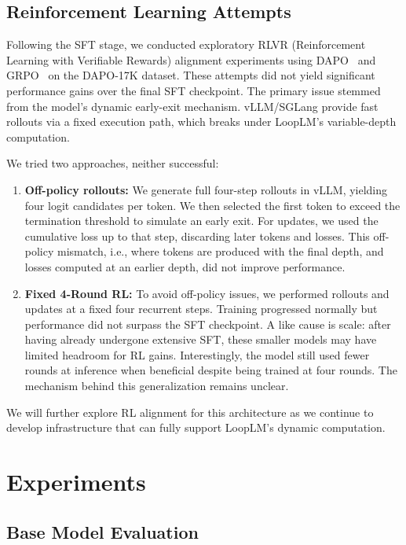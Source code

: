 \documentclass[]{bytedance_seed}
\newcommand{\1}{\mathbf{1}}
\newcommand{\ut}{LoopLM}
\begin{document}
\subsection{Reinforcement Learning Attempts}

Following the SFT stage, we conducted exploratory RLVR (Reinforcement Learning with Verifiable Rewards) alignment experiments using DAPO~\cite{yu2025dapo} and GRPO~\cite{shao2024deepseekmath} on the DAPO-17K dataset. These attempts did not yield significant performance gains over the final SFT checkpoint. The primary issue stemmed from the model's dynamic early-exit mechanism. vLLM/SGLang provide fast rollouts via a fixed execution path, which breaks under \ut{}'s variable-depth computation.  

We tried two approaches, neither successful:

\begin{enumerate}
    \item \textbf{Off-policy rollouts:} We generate full four-step rollouts in vLLM, yielding four logit candidates per token. We then selected the first token to exceed the termination threshold to simulate an early exit. For updates, we used the cumulative loss up to that step, discarding later tokens and losses. This off-policy mismatch, i.e., where tokens are produced with the final depth, and losses computed at an earlier depth, did not improve performance.

    \item \textbf{Fixed 4-Round RL:} To avoid off-policy issues, we performed rollouts and updates at a fixed four recurrent steps. Training progressed normally but performance did not surpass the SFT checkpoint. A like cause is scale: after having already undergone extensive SFT, these smaller models may have limited headroom for RL gains. Interestingly, the model still used fewer rounds at inference when beneficial despite being trained at four rounds. The mechanism behind this generalization remains unclear.
\end{enumerate}


We will further explore RL alignment for this architecture as we continue to develop infrastructure that can fully support \ut{}'s dynamic computation.
\newpage
\section{Experiments}
\subsection{Base Model Evaluation}
\end{document}
